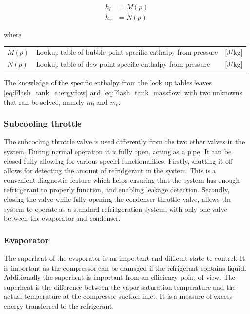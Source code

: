 \begin{align}
	h_{l}  & = M(p)\\
	h_{v}  & = N(p)
\end{align}

where

\begin{center}
	\begin{tabular}{l p{8cm} l}
		$M(p)$ & Lookup table of bubble point specific enthalpy from pressure & [\si{J}/\si{kg}] \\
		$N(p)$ & Lookup table of dew point specific enthalpy from pressure    & [\si{J}/\si{kg}]
	\end{tabular}
\end{center}

The knowledge of the specific enthalpy from the look up tables leaves \cref{eq:Flash_tank_energyflow} and \cref{eq:Flash_tank_massflow} with two unknowns that can be solved, namely $ m_l $ and $ m_v $.

\subsubsection{Subcooling throttle}
The subcooling throttle valve is used differently from the two other valves in the system. During normal operation it is fully open, acting as a pipe. It can be closed fully allowing for various speciel functionalities. Firstly, shutting it off allows for detecting the amount of refridgerant in the system. This is a convenient diagnostic feature which helps ensuring that the system has enough refridgerant to properly function, and enabling leakage detection. Secondly, closing the valve while fully opening the condenser throttle valve, allows the system to operate as a standard refridgeration system, with only one valve between the evaporator and condenser.


\subsubsection{Evaporator}
The superheat of the evaporator is an important and difficult state to control. It is important as the compressor can be damaged if the refrigerant contains liquid. Additionally the superheat is important from an efficiency point of view.
The superheat is the difference between the vapor saturation temperature and the actual temperature at the compressor suction inlet. It is a measure of excess energy transferred to the refrigerant.

\clearpage

